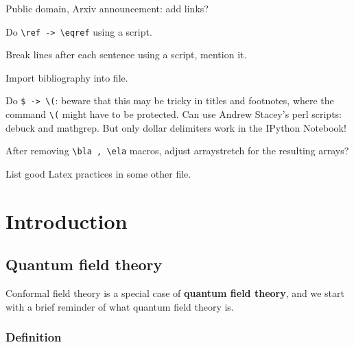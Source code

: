 \documentclass[12pt,a4paper,notitlepage]{report}
\newcommand \bla {\left\{\begin{array}{l} }
\newcommand \ela {\end{array}\right. }
\numberwithin{equation}{section}
\theoremstyle{break}
\begin{document}
Public domain, Arxiv announcement: add links?

Do \verb+\ref -> \eqref+ using a script.

Break lines after each sentence using a script, mention it.

Import bibliography into file. 

Do \verb+$ -> \(+: beware that this may be tricky in titles and footnotes, where the command \verb+\(+ might have to be protected.
Can use Andrew Stacey's perl scripts: debuck and mathgrep. But only dollar delimiters work in the IPython Notebook!

After removing \verb+\bla , \ela+ macros, adjust arraystretch for the resulting arrays? 

List good Latex practices in some other file.


\chapter{Introduction \label{secintr}}

\section{Quantum field theory \label{secqft} }

Conformal field theory is a special case of \textbf{\boldmath quantum field theory}, and we start with a brief reminder of what quantum field theory is.

\subsection{Definition} 
\end{document}
